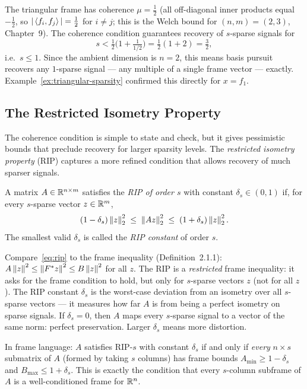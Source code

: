 \begin{examplebox}[title={Example 12.2: Coherence bound for the triangular frame}]
\label{ex:coherence-bound-triangle}
The triangular frame has coherence $\mu = \tfrac12$ (all off-diagonal
inner products equal $-\tfrac12$, so $|\left\langle f_i, f_j \right\rangle|=\tfrac12$
for $i\ne j$; this is the Welch bound for $(n,m)=(2,3)$, Chapter~9).
The coherence condition guarantees recovery of $s$-sparse signals for
\[
  s < \tfrac12\bigl(1+\tfrac1{1/2}\bigr)
  = \tfrac12(1+2) = \tfrac32,
\]
i.e.\ $s\le 1$. Since the ambient dimension is $n=2$, this means basis
pursuit recovers any $1$-sparse signal --- any multiple of a single
frame vector --- exactly. Example~\ref{ex:triangular-sparsity}
confirmed this directly for $x=f_1$.
\end{examplebox}

\subsection{The Restricted Isometry Property}
\label{subsec:rip}

The coherence condition is simple to state and check, but it gives
pessimistic bounds that preclude recovery for larger sparsity levels.
The \emph{restricted isometry property} (RIP) captures a more refined
condition that allows recovery of much sparser signals.

\begin{definition}
\label{def:rip}
A matrix $A\in\mathbb{R}^{n\times m}$ satisfies the \emph{RIP of order $s$}
with constant $\delta_s\in(0,1)$ if, for every $s$-sparse vector
$z\in\mathbb{R}^m$,
\begin{equation}
\label{eq:rip}
  (1-\delta_s)\left\| z \right\|_2^2 \;\le\; \left\| Az \right\|_2^2 \;\le\; (1+\delta_s)\left\| z \right\|_2^2.
\end{equation}
The smallest valid $\delta_s$ is called the \emph{RIP constant} of
order $s$.
\end{definition}

\begin{remark*}
Compare~\eqref{eq:rip} to the frame inequality (Definition~2.1.1):
$A\left\| z \right\|^2\le\left\| F^*z \right\|^2\le B\left\| z \right\|^2$ for all $z$. The RIP is
a \emph{restricted} frame inequality: it asks for the frame condition
to hold, but only for $s$-sparse vectors $z$ (not for all $z$). The
RIP constant $\delta_s$ is the worst-case deviation from an isometry
over all $s$-sparse vectors --- it measures how far $A$ is from
being a perfect isometry on sparse signals. If $\delta_s=0$, then
$A$ maps every $s$-sparse signal to a vector of the same norm: perfect
preservation. Larger $\delta_s$ means more distortion.

In frame language: $A$ satisfies RIP-$s$ with constant $\delta_s$ if
and only if \emph{every} $n\times s$ submatrix of $A$ (formed by
taking $s$ columns) has frame bounds $A_{\min}\ge 1-\delta_s$ and
$B_{\max}\le 1+\delta_s$. This is exactly the condition that every
$s$-column subframe of $A$ is a well-conditioned frame for $\mathbb{R}^n$.
\end{remark*}

